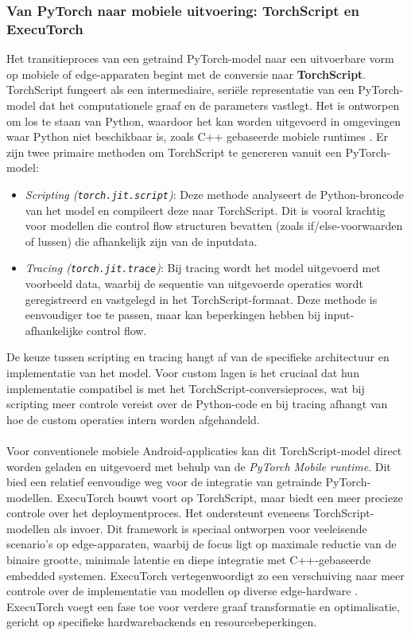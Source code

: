 \subsubsection{Van PyTorch naar mobiele uitvoering: TorchScript en ExecuTorch}
\label{sssec:torchscript-executorch}

Het transitieproces van een getraind PyTorch-model naar een uitvoerbare vorm op mobiele of edge-apparaten begint met de conversie naar \textbf{TorchScript}.
TorchScript fungeert als een intermediaire, seriële representatie van een PyTorch-model dat het computationele graaf en de parameters vastlegt.
Het is ontworpen om los te staan van Python, waardoor het kan worden uitgevoerd in omgevingen waar Python niet beschikbaar is, zoals C++ gebaseerde mobiele runtimes \autocite{pytorch_jit}.
Er zijn twee primaire methoden om TorchScript te genereren vanuit een PyTorch-model:
\begin{itemize}
    \item \textit{Scripting (\texttt{torch.jit.script})}: Deze methode analyseert de Python-broncode van het model en compileert deze naar TorchScript.
Dit is vooral krachtig voor modellen die control flow structuren bevatten (zoals if/else-voorwaarden of lussen) die afhankelijk zijn van de inputdata.
    \item \textit{Tracing (\texttt{torch.jit.trace})}: Bij tracing wordt het model uitgevoerd met voorbeeld data, waarbij de sequentie van uitgevoerde operaties wordt geregistreerd en vastgelegd in het TorchScript-formaat.
Deze methode is eenvoudiger toe te passen, maar kan beperkingen hebben bij input-afhankelijke control flow.
\end{itemize}
De keuze tussen scripting en tracing hangt af van de specifieke architectuur en implementatie van het model.
Voor custom lagen is het cruciaal dat hun implementatie compatibel is met het TorchScript-conversieproces, wat bij scripting meer controle vereist over de Python-code en bij tracing afhangt van hoe de custom operaties intern worden afgehandeld.
\\
\\
Voor conventionele mobiele Android-applicaties kan dit TorchScript-model direct worden geladen en uitgevoerd met behulp van de \textit{PyTorch Mobile runtime}.
Dit bied een relatief eenvoudige weg voor de integratie van getrainde PyTorch-modellen.
ExecuTorch bouwt voort op TorchScript, maar biedt een meer precieze controle over het deploymentproces. 
Het ondersteunt eveneens TorchScript-modellen als invoer. 
Dit framework is speciaal ontworpen voor veeleisende scenario's op edge-apparaten, waarbij de focus ligt op maximale reductie van de binaire grootte, minimale latentie en diepe integratie met C++-gebaseerde embedded systemen. 
ExecuTorch vertegenwoordigt zo een verschuiving naar meer controle over de implementatie van modellen op diverse edge-hardware \autocite{executorch2023}. 
ExecuTorch voegt een fase toe voor verdere graaf transformatie en optimalisatie, gericht op specifieke hardwarebackends en resourcebeperkingen.

